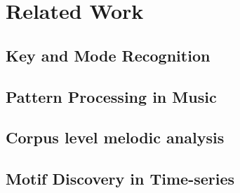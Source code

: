 {\section{Related Work}
\label{sec:background_relevant_work_other_music}

\subsection{Key and Mode Recognition}

\subsection{Pattern Processing in Music}




\subsection{Corpus level melodic analysis}

\subsection{Motif Discovery in Time-series}


}
